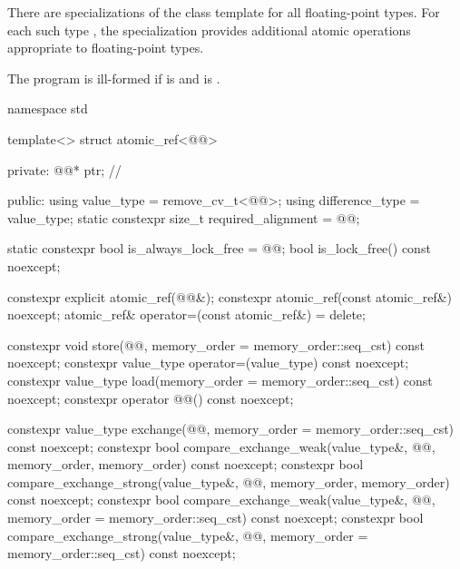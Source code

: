 \pnum
{}%
There are specializations of the  class template
for all floating-point types.
For each such type ,
the specialization  provides
additional atomic operations appropriate to floating-point types.

\pnum
The program is ill-formed
if  is  and
 is .

\begin{codeblock}
namespace std {
  template<> struct atomic_ref<@@> {
  private:
    @@* ptr;   // \expos

  public:
    using value_type = remove_cv_t<@@>;
    using difference_type = value_type;
    static constexpr size_t required_alignment = @@;

    static constexpr bool is_always_lock_free = @@;
    bool is_lock_free() const noexcept;

    constexpr explicit atomic_ref(@@&);
    constexpr atomic_ref(const atomic_ref&) noexcept;
    atomic_ref& operator=(const atomic_ref&) = delete;

    constexpr void store(@@,
                         memory_order = memory_order::seq_cst) const noexcept;
    constexpr value_type operator=(value_type) const noexcept;
    constexpr value_type load(memory_order = memory_order::seq_cst) const noexcept;
    constexpr operator @@() const noexcept;

    constexpr value_type exchange(@@,
                                 memory_order = memory_order::seq_cst) const noexcept;
    constexpr bool compare_exchange_weak(value_type&, @@,
                               memory_order, memory_order) const noexcept;
    constexpr bool compare_exchange_strong(value_type&, @@,
                                 memory_order, memory_order) const noexcept;
    constexpr bool compare_exchange_weak(value_type&, @@,
                               memory_order = memory_order::seq_cst) const noexcept;
    constexpr bool compare_exchange_strong(value_type&, @@,
                                 memory_order = memory_order::seq_cst) const noexcept;

}}
\end{codeblock}
